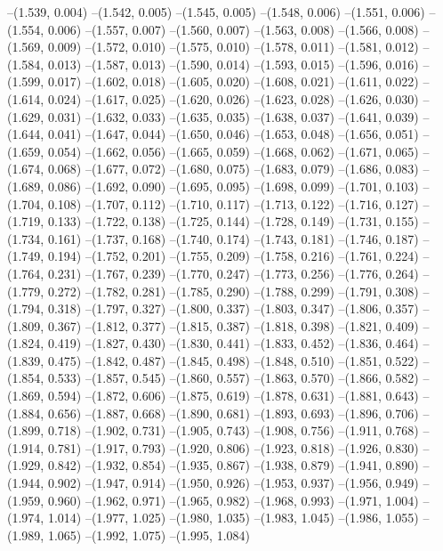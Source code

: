 --(1.539, 0.004)
--(1.542, 0.005)
--(1.545, 0.005)
--(1.548, 0.006)
--(1.551, 0.006)
--(1.554, 0.006)
--(1.557, 0.007)
--(1.560, 0.007)
--(1.563, 0.008)
--(1.566, 0.008)
--(1.569, 0.009)
--(1.572, 0.010)
--(1.575, 0.010)
--(1.578, 0.011)
--(1.581, 0.012)
--(1.584, 0.013)
--(1.587, 0.013)
--(1.590, 0.014)
--(1.593, 0.015)
--(1.596, 0.016)
--(1.599, 0.017)
--(1.602, 0.018)
--(1.605, 0.020)
--(1.608, 0.021)
--(1.611, 0.022)
--(1.614, 0.024)
--(1.617, 0.025)
--(1.620, 0.026)
--(1.623, 0.028)
--(1.626, 0.030)
--(1.629, 0.031)
--(1.632, 0.033)
--(1.635, 0.035)
--(1.638, 0.037)
--(1.641, 0.039)
--(1.644, 0.041)
--(1.647, 0.044)
--(1.650, 0.046)
--(1.653, 0.048)
--(1.656, 0.051)
--(1.659, 0.054)
--(1.662, 0.056)
--(1.665, 0.059)
--(1.668, 0.062)
--(1.671, 0.065)
--(1.674, 0.068)
--(1.677, 0.072)
--(1.680, 0.075)
--(1.683, 0.079)
--(1.686, 0.083)
--(1.689, 0.086)
--(1.692, 0.090)
--(1.695, 0.095)
--(1.698, 0.099)
--(1.701, 0.103)
--(1.704, 0.108)
--(1.707, 0.112)
--(1.710, 0.117)
--(1.713, 0.122)
--(1.716, 0.127)
--(1.719, 0.133)
--(1.722, 0.138)
--(1.725, 0.144)
--(1.728, 0.149)
--(1.731, 0.155)
--(1.734, 0.161)
--(1.737, 0.168)
--(1.740, 0.174)
--(1.743, 0.181)
--(1.746, 0.187)
--(1.749, 0.194)
--(1.752, 0.201)
--(1.755, 0.209)
--(1.758, 0.216)
--(1.761, 0.224)
--(1.764, 0.231)
--(1.767, 0.239)
--(1.770, 0.247)
--(1.773, 0.256)
--(1.776, 0.264)
--(1.779, 0.272)
--(1.782, 0.281)
--(1.785, 0.290)
--(1.788, 0.299)
--(1.791, 0.308)
--(1.794, 0.318)
--(1.797, 0.327)
--(1.800, 0.337)
--(1.803, 0.347)
--(1.806, 0.357)
--(1.809, 0.367)
--(1.812, 0.377)
--(1.815, 0.387)
--(1.818, 0.398)
--(1.821, 0.409)
--(1.824, 0.419)
--(1.827, 0.430)
--(1.830, 0.441)
--(1.833, 0.452)
--(1.836, 0.464)
--(1.839, 0.475)
--(1.842, 0.487)
--(1.845, 0.498)
--(1.848, 0.510)
--(1.851, 0.522)
--(1.854, 0.533)
--(1.857, 0.545)
--(1.860, 0.557)
--(1.863, 0.570)
--(1.866, 0.582)
--(1.869, 0.594)
--(1.872, 0.606)
--(1.875, 0.619)
--(1.878, 0.631)
--(1.881, 0.643)
--(1.884, 0.656)
--(1.887, 0.668)
--(1.890, 0.681)
--(1.893, 0.693)
--(1.896, 0.706)
--(1.899, 0.718)
--(1.902, 0.731)
--(1.905, 0.743)
--(1.908, 0.756)
--(1.911, 0.768)
--(1.914, 0.781)
--(1.917, 0.793)
--(1.920, 0.806)
--(1.923, 0.818)
--(1.926, 0.830)
--(1.929, 0.842)
--(1.932, 0.854)
--(1.935, 0.867)
--(1.938, 0.879)
--(1.941, 0.890)
--(1.944, 0.902)
--(1.947, 0.914)
--(1.950, 0.926)
--(1.953, 0.937)
--(1.956, 0.949)
--(1.959, 0.960)
--(1.962, 0.971)
--(1.965, 0.982)
--(1.968, 0.993)
--(1.971, 1.004)
--(1.974, 1.014)
--(1.977, 1.025)
--(1.980, 1.035)
--(1.983, 1.045)
--(1.986, 1.055)
--(1.989, 1.065)
--(1.992, 1.075)
--(1.995, 1.084)
